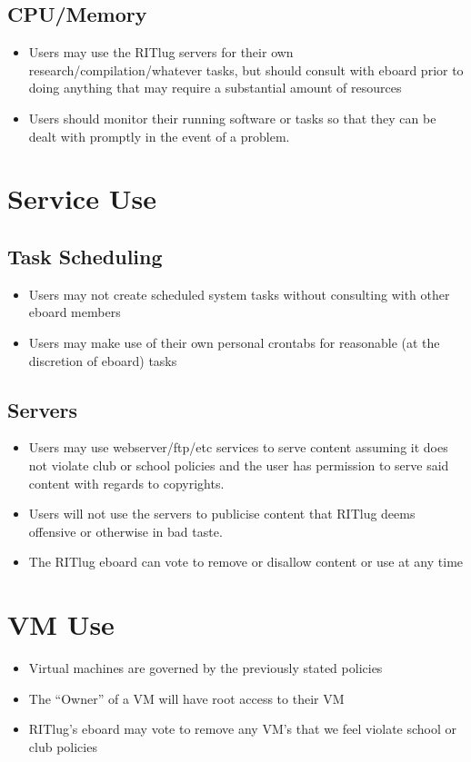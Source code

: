 \documentclass[a4paper]{article}
\begin{document}
\subsection{CPU/Memory}
\begin{itemize}
\item Users may use the RITlug servers for their own research/compilation/whatever tasks, but should consult with eboard prior to doing anything that may require a substantial amount of resources
\item Users should monitor their running software or tasks so that they can be dealt with promptly in the event of a problem.

\end{itemize}

\section{Service Use}
\subsection{Task Scheduling}
\begin{itemize}
\item Users may not create scheduled system tasks without consulting with other eboard members
\item Users may make use of their own personal crontabs for reasonable (at the discretion of eboard) tasks

\end{itemize}
\subsection{Servers}
\begin{itemize}
\item Users may use webserver/ftp/etc services to serve content assuming it does not violate club or school policies and the user has permission to serve said content with regards to copyrights.
\item Users will not use the servers to publicise content that RITlug deems offensive or otherwise in bad taste.
\item The RITlug eboard can vote to remove or disallow content or use at any time
\end{itemize}

\section{VM Use}
\begin{itemize}
\item Virtual machines are governed by the previously stated policies
\item The “Owner” of a VM will have root access to their VM
\item RITlug’s eboard may vote to remove any VM’s that we feel violate school or club policies
\end{itemize}
\end{document}
